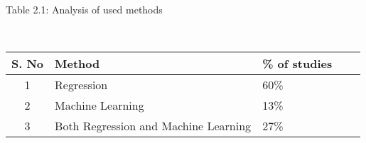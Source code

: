 \documentclass[12pt, English]{article}
\begin{document}
\begin{normalsize}
\begin{table}[h]
    \centering
    \large %
       \begin{center}
           Table 2.1: Analysis of used  methods 
       \end{center}
       \newline
    \\
        \begin{tabular}{|c|p{5cm}|p{2cm}|p{2cm}|c|} 
        \hline
        \textbf{\large S. No} & \textbf{\large Method} & \textbf{\large \% of studies} \\
        \hline
        1 & Regression & 60\% \\
        \hline
        2 & Machine Learning & 13\% \\
        \hline
        3 & Both Regression and Machine Learning & 27\% \\
        \hline
    \end{tabular}
    \label{tab:sample}
\end{table}

\\


\end{normalsize}
\end{document}
